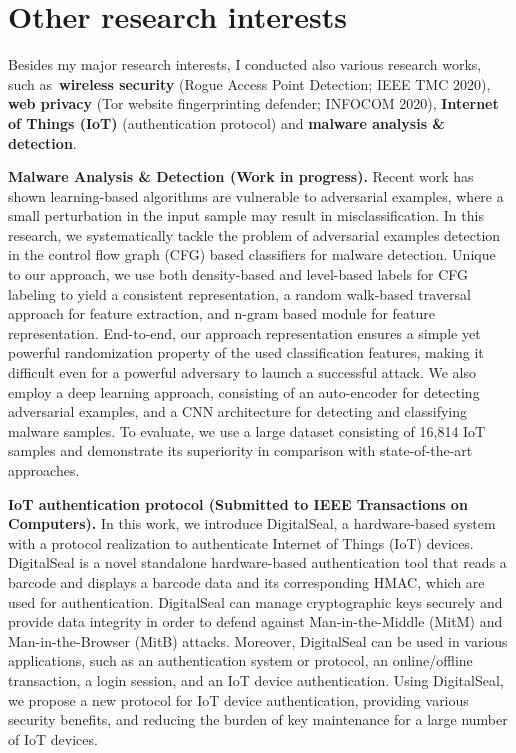 \documentclass{NSF}
\newcommand{\BfPara}[1]{{\noindent\textbf{#1.}}\xspace}
\begin{document}
\section{Other research interests} \vspace{-1mm}
Besides my major research interests, I conducted also various research works, such as~\textbf{wireless security} (Rogue Access Point Detection; IEEE TMC 2020), \textbf{web privacy} (Tor website fingerprinting defender; INFOCOM 2020), \textbf{Internet of Things (IoT)} (authentication protocol)  and \textbf{malware analysis \& detection}. %

\BfPara{Malware Analysis \& Detection (Work in progress)} Recent work has shown learning-based algorithms are vulnerable to adversarial examples, where a small perturbation in the input sample may result in misclassification. In this research, we systematically tackle the problem of adversarial examples detection in the control flow graph (CFG) based classifiers for malware detection. Unique to our approach, we use both density-based and level-based labels for CFG labeling to yield a consistent representation, a random walk-based traversal approach for feature extraction, and n-gram based module for feature representation. End-to-end, our approach representation ensures a simple yet powerful randomization property of the used classification features, making it difficult even for a powerful adversary to launch a successful attack. We also employ a deep learning approach, consisting of an auto-encoder for detecting adversarial examples, and a CNN architecture for detecting and classifying malware samples. To evaluate, we use a large dataset consisting of 16,814 IoT samples and demonstrate its superiority in comparison with state-of-the-art approaches. 

\BfPara{IoT authentication protocol (Submitted to IEEE Transactions on Computers)} In this work, we introduce DigitalSeal, a hardware-based system with a protocol realization to authenticate Internet of Things (IoT) devices. DigitalSeal is a novel standalone hardware-based authentication tool that reads a barcode and displays a barcode data and its corresponding HMAC, which are used for authentication. DigitalSeal can manage cryptographic keys securely and provide data integrity in order to defend against Man-in-the-Middle (MitM) and Man-in-the-Browser (MitB) attacks. Moreover, DigitalSeal can be used in various applications, such as an authentication system or protocol, an online/offline transaction, a login session, and an IoT device authentication. Using DigitalSeal, we propose a new protocol for IoT device authentication, providing various security benefits, and reducing the burden of key maintenance for a large number of IoT devices. 
\end{document}
